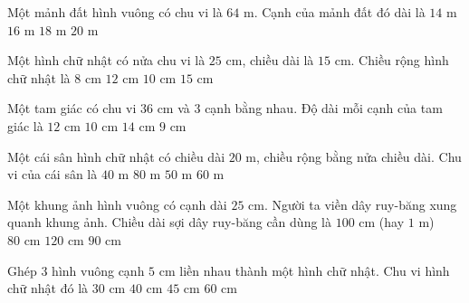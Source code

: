 \begin{ex} %
Một mảnh đất hình vuông có chu vi là $64\text{ m}$. Cạnh của mảnh đất đó dài là
\choice
{$14\text{ m}$}
{\True $16\text{ m}$}
{$18\text{ m}$}
{$20\text{ m}$}
\end{ex}

\begin{ex} %
Một hình chữ nhật có nửa chu vi là $25\text{ cm}$, chiều dài là $15\text{ cm}$. Chiều rộng hình chữ nhật là
\choice
{$8\text{ cm}$}
{$12\text{ cm}$}
{\True $10\text{ cm}$}
{$15\text{ cm}$}
\end{ex}

\begin{ex} %
Một tam giác có chu vi $36\text{ cm}$ và 3 cạnh bằng nhau. Độ dài mỗi cạnh của tam giác là
\choice
{\True $12\text{ cm}$}
{$10\text{ cm}$}
{$14\text{ cm}$}
{$9\text{ cm}$}
\end{ex}

\begin{ex} %
Một cái sân hình chữ nhật có chiều dài $20\text{ m}$, chiều rộng bằng nửa chiều dài. Chu vi của cái sân là
\choice
{$40\text{ m}$}
{$80\text{ m}$}
{$50\text{ m}$}
{\True $60\text{ m}$}
\end{ex}

\begin{ex} %
Một khung ảnh hình vuông có cạnh dài $25\text{ cm}$. Người ta viền dây ruy-băng xung quanh khung ảnh. Chiều dài sợi dây ruy-băng cần dùng là
\choice
{\True $100\text{ cm}$ (hay $1\text{ m}$)}
{$80\text{ cm}$}
{$120\text{ cm}$}
{$90\text{ cm}$}
\end{ex}

\begin{ex} %
Ghép 3 hình vuông cạnh $5\text{ cm}$ liền nhau thành một hình chữ nhật. Chu vi hình chữ nhật đó là
\choice
{$30\text{ cm}$}
{\True $40\text{ cm}$}
{$45\text{ cm}$}
{$60\text{ cm}$}
\end{ex}

